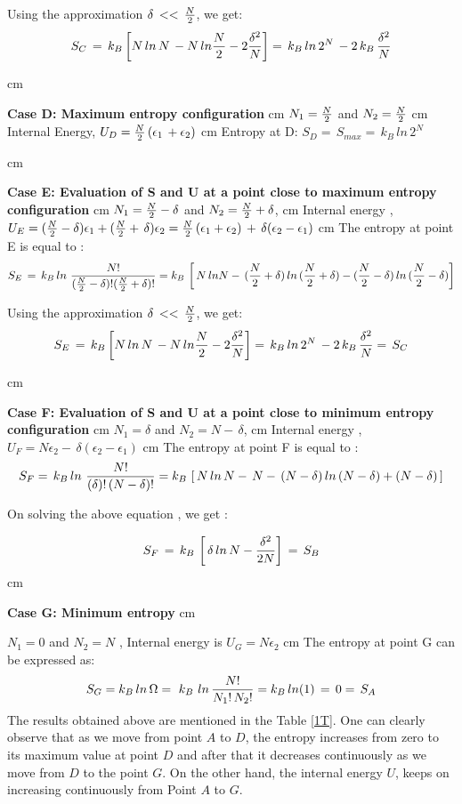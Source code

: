 \documentclass{article}
\begin{document}
 Using the approximation $ \delta \, << \, { N \over 2}$, we get:
 $$ S_C \, = \, k_B \left[ N \, ln \, N \,  - N \, ln { N \over 2} - {2 {\delta^{2} \over N} } \right ] = \, k_B \, ln\, {2^N}\, - {2\, k_B\, {\delta^{2} \over N} }$$
 
  cm
 
{\bf Case D: Maximum entropy configuration}
 cm
$N_1 = { N \over2}$ and $N_2 = { N \over2}$
 cm
Internal Energy, $U_D = {N \over2} \, ( \epsilon_1 \, + \epsilon_2)$
 cm
Entropy at D: 
$ S_D =\,  S_{max} = \, k_B \, ln\, {2^N}$

 cm

{\bf Case E:  Evaluation of S and U at a point close to maximum entropy configuration}
 cm
 $N_1 = {N \over2} - \delta $ and $N_2 = {N \over2} + \delta $, 
  cm
 Internal energy , $U_E = ({N \over2} - \delta)\epsilon_1 + ({N \over 2} +\, \delta)\epsilon_2 = {N\over 2} \,( \epsilon_1 + \epsilon_2) \, + \,  \delta ( \epsilon_2 - \epsilon_1)$
  cm
 The entropy at point E is equal to : 
 $$ S_E \,= \, k_B \, ln \,\,{ N! \over { ( {N \over 2} -  \delta )! ( {N \over 2} + \delta )!}} = k_B\,\left[ \, N\, ln N - \,( {N \over 2} +  \delta )\, ln\, ( {N \over 2} +  \delta ) - ( {N \over 2} - \delta )\, ln \,( {N \over 2} -  \delta )\right]$$
 
 Using the approximation $ \delta \, << \, { N \over 2}$, we get:
 $$ S_E \, = \, k_B \left[ N \, ln \, N \,  - N \, ln { N \over 2} - {2 {\delta^{2} \over N} } \right ] = \, k_B \, ln\, {2^N}\, - {2\, k_B\, {\delta^{2} \over N} } = \, S_C$$
 
 cm

{\bf Case F: Evaluation of S and U at a point close to minimum entropy configuration}
 cm
 $N_1 = \delta $ and $N_2 =  N - \,\delta $, 
  cm
 Internal energy , $U_F = {N}\epsilon_2  -\,  \delta ( \epsilon_2 - \epsilon_1)$
  cm
 The entropy at point F is equal to : 
 $$ S_F= \, k_B \, ln \,\,{ N! \over {(\delta )! \,( {N} - \delta )! }} = k_B\,\left[ \, N\, ln \,N - \, N - \,( {N} - \delta )\, ln\, ( {N } -  \delta ) + ( {N } - \delta )\, \right] $$

On solving the above equation , we get :

$$ S_F \, = \, k_B\, \left[ \, \delta\, ln \, N - { \delta^2 \over {2 N}}\right] \, = \, S_B$$
 cm

{\bf Case G:  Minimum entropy}
 cm

$ N_1  = 0 $ and $N_2 = N$ , Internal energy  is $ U_G = N\epsilon_2$
 cm
The entropy at point G can be expressed as:
$$ S_G = k_B \, ln \, \Omega  = \,\,k_B\,\,ln\, { N! \over {N_1! \, N_2!}} = k_B\, ln (1)\, = \, 0  =\, S_A$$  
\vskip 0.5cm
The results obtained above are mentioned in the Table {\ref{1T}}. One can clearly observe that as we move from point $A$ to $D$, the entropy increases from zero to its maximum value at point $D$ and after that it decreases continuously  as we move from  $D$ to the point $G$. On the other hand, the internal energy $U$, keeps on increasing continuously from Point $A$ to $G$. 
\end{document}
